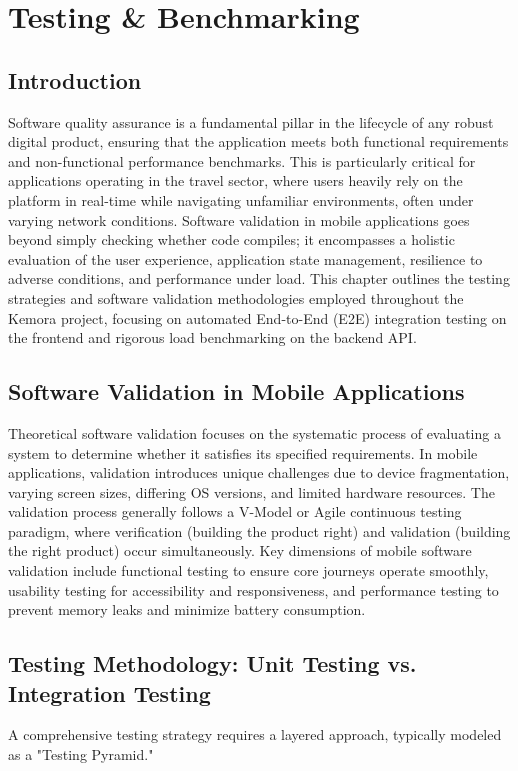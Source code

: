 \chapter{Testing \& Benchmarking}

\section{Introduction}
Software quality assurance is a fundamental pillar in the lifecycle of any robust digital product, ensuring that the application meets both functional requirements and non-functional performance benchmarks. This is particularly critical for applications operating in the travel sector, where users heavily rely on the platform in real-time while navigating unfamiliar environments, often under varying network conditions. Software validation in mobile applications goes beyond simply checking whether code compiles; it encompasses a holistic evaluation of the user experience, application state management, resilience to adverse conditions, and performance under load. This chapter outlines the testing strategies and software validation methodologies employed throughout the Kemora project, focusing on automated End-to-End (E2E) integration testing on the frontend and rigorous load benchmarking on the backend API. 

\section{Software Validation in Mobile Applications}
Theoretical software validation focuses on the systematic process of evaluating a system to determine whether it satisfies its specified requirements. In mobile applications, validation introduces unique challenges due to device fragmentation, varying screen sizes, differing OS versions, and limited hardware resources. The validation process generally follows a V-Model or Agile continuous testing paradigm, where verification (building the product right) and validation (building the right product) occur simultaneously. Key dimensions of mobile software validation include functional testing to ensure core journeys operate smoothly, usability testing for accessibility and responsiveness, and performance testing to prevent memory leaks and minimize battery consumption. 

\section{Testing Methodology: Unit Testing vs. Integration Testing}
A comprehensive testing strategy requires a layered approach, typically modeled as a "Testing Pyramid."

